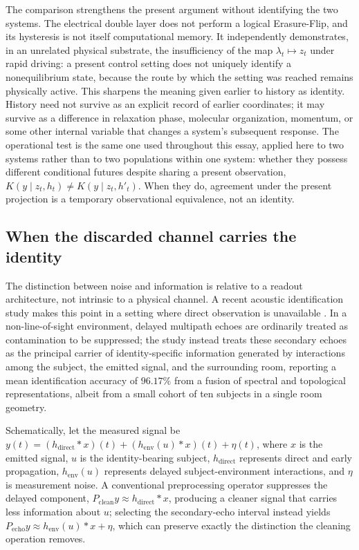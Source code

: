 \documentclass[11pt]{article}
\begin{document}
The comparison strengthens the present argument without identifying the two systems. The electrical double layer does not perform a logical Erasure-Flip, and its hysteresis is not itself computational memory. It independently demonstrates, in an unrelated physical substrate, the insufficiency of the map $\lambda_t\mapsto z_t$ under rapid driving: a present control setting does not uniquely identify a nonequilibrium state, because the route by which the setting was reached remains physically active. This sharpens the meaning given earlier to history as identity. History need not survive as an explicit record of earlier coordinates; it may survive as a difference in relaxation phase, molecular organization, momentum, or some other internal variable that changes a system's subsequent response. The operational test is the same one used throughout this essay, applied here to two systems rather than to two populations within one system: whether they possess different conditional futures despite sharing a present observation, $K(y\mid z_t,h_t)\neq K(y\mid z_t,h'_t)$. When they do, agreement under the present projection is a temporary observational equivalence, not an identity.

\subsection{When the discarded channel carries the identity}

The distinction between noise and information is relative to a readout architecture, not intrinsic to a physical channel. A recent acoustic identification study makes this point in a setting where direct observation is unavailable \cite{Olgun2026}. In a non-line-of-sight environment, delayed multipath echoes are ordinarily treated as contamination to be suppressed; the study instead treats these secondary echoes as the principal carrier of identity-specific information generated by interactions among the subject, the emitted signal, and the surrounding room, reporting a mean identification accuracy of $96.17\%$ from a fusion of spectral and topological representations, albeit from a small cohort of ten subjects in a single room geometry.

Schematically, let the measured signal be $y(t) = (h_{\mathrm{direct}}*x)(t) + (h_{\mathrm{env}}(u)*x)(t) + \eta(t)$, where $x$ is the emitted signal, $u$ is the identity-bearing subject, $h_{\mathrm{direct}}$ represents direct and early propagation, $h_{\mathrm{env}}(u)$ represents delayed subject-environment interactions, and $\eta$ is measurement noise. A conventional preprocessing operator suppresses the delayed component, $P_{\mathrm{clean}}y \approx h_{\mathrm{direct}}*x$, producing a cleaner signal that carries less information about $u$; selecting the secondary-echo interval instead yields $P_{\mathrm{echo}}y \approx h_{\mathrm{env}}(u)*x + \eta$, which can preserve exactly the distinction the cleaning operation removes.
\end{document}
